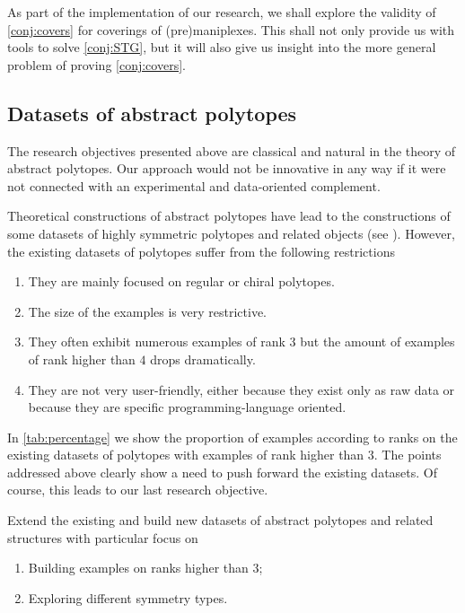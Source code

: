 As part of the implementation of our research, we shall explore the validity of \cref{conj:covers} for coverings of (pre)maniplexes. 
This shall not only provide us with tools to solve \cref{conj:STG}, but it will also give us insight into the more general problem of proving \cref{conj:covers}.


\subsection*{Datasets of abstract polytopes} \label{sec:datasets}

The research objectives presented above are classical and natural in the theory of abstract polytopes. 
Our approach would not be innovative in any way if it were not connected with an experimental and data-oriented complement.


Theoretical constructions of abstract polytopes have lead to the constructions of some datasets of highly symmetric polytopes and related objects (see \cite{Conder2013_ChiralRotaryMaps,Conder2012_RegularNonOrientable,Conder2012_RotaryMapsOn,Conder2012_RegularPolytopes2000,Conder2011_RegularOrientableMaps,Conder2006_ChiralOrientablyRegular,Potocnik2014_CensusChiralMaps,Potocnik2014_CensusChiralMaps,LeLaCoMiMu_AtlasPolytopesSmall,HartHubLee_AtlasChiralPolytopes,Hartley2006_AtlasSmallChiral,Hartley2006_AtlasSmallRegular}).
However, the existing datasets of polytopes suffer from the following restrictions
\begin{enumerate}[label=\textit{(\roman*)}, noitemsep]
  \item They are mainly focused on regular or chiral polytopes.
  \item The size of the examples is very restrictive.
  \item They often exhibit numerous examples of rank $3$ but the amount of examples of rank higher than $4$ drops dramatically.
  \item They are not very user-friendly, either because they exist only as raw data or because they are specific programming-language oriented.
\end{enumerate}

In  \cref{tab:percentage} we show the proportion of examples according to ranks on the existing datasets of polytopes with examples of rank higher than $3$.
The points addressed above clearly show a need to push forward the existing datasets. 
Of course, this leads to our last research objective.

\begin{obj}\label{obj:datasets}
  Extend the existing and build new datasets of abstract polytopes and related structures with particular focus on
  \begin{enumerate}[label=\textit{(\roman*)}, noitemsep]
    \item Building examples on ranks higher than $3$;
    \item Exploring different symmetry types.
  \end{enumerate}
\end{obj}

